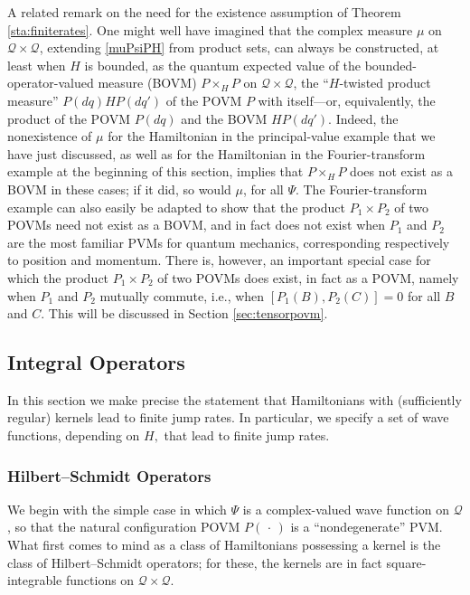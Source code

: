 \documentclass[12pt]{article}
\newcommand{\1}{\mathbf{1}} %
\newcommand{\conf}{\mathcal{Q}} %
\newcommand{\pov}{{P}}%
\begin{document}
A related remark on the need for the existence assumption of Theorem
\ref{sta:finiterates}. One might well have imagined that the complex
measure $\mu$ on $\conf \times \conf$, extending \eqref{muPsiPH} from
product sets, can always be constructed, at least when $H$ is bounded,
as the quantum expected value of the bounded-operator-valued measure
(BOVM) $\pov\times_{H} \pov$ on $\conf \times \conf$, the
``$H$-twisted product measure'' $\pov(dq)H\pov(dq')$ of the POVM
$\pov$ with itself---or, equivalently, the product of the POVM
$\pov(dq)$ and the BOVM $H\pov(dq')$. Indeed, the nonexistence of
$\mu$ for the Hamiltonian in the principal-value example that we have
just discussed, as well as for the Hamiltonian in the
Fourier-transform example at the beginning of this section, implies
that $\pov\times_{H}\pov$ does not exist as a BOVM in these cases; if
it did, so would $\mu$, for all $\Psi$. The Fourier-transform example
can also easily be adapted to show that the product $\pov_1\times
\pov_2$ of two POVMs need not exist as a BOVM, and in fact does not
exist when $\pov_1$ and $\pov_2$ are the most familiar PVMs for
quantum mechanics, corresponding respectively to position and
momentum. There is, however, an important special case for which the
product $\pov_1\times \pov_2$ of two POVMs does exist, in fact as a
POVM, namely when $\pov_1$ and $\pov_2$ mutually commute, i.e., when
$[\pov_1(B),\pov_2(C)]=0$ for all $B$ and $C$. This will be discussed
in Section \ref{sec:tensorpovm}.



\subsection{Integral Operators}
\label{sec:jumps}

In this section we make precise the statement that Hamiltonians with
(sufficiently regular) kernels lead to finite jump rates. In
particular, we specify a set of wave functions, depending on $H,$ that
lead to finite jump rates.

\subsubsection{Hilbert--Schmidt Operators}\label{sec:HS}

We begin with the simple case in which $\Psi$ is a complex-valued wave
function on $\conf$, so that the natural configuration POVM
$\pov(\,\cdot\,)$ is a ``nondegenerate'' PVM. What first comes to mind
as a class of Hamiltonians possessing a kernel is the class of
Hilbert--Schmidt operators; for these, the kernels are in fact
square-integrable functions on $\conf \times \conf$.
\end{document}
